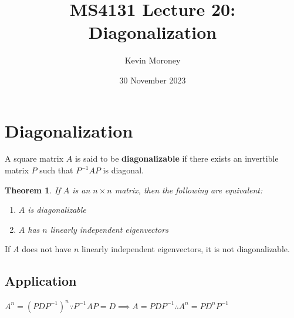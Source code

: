 \documentclass[a4paper, 12pt]{article}
\title{MS4131 Lecture 20: Diagonalization}
\author{Kevin Moroney}
\date{30 November 2023}
\newtheorem{theorem}{Theorem}[section]
\newenvironment{definition}[1][Definition]{\begin{trivlist}
\item[\hskip \labelsep {\bfseries #1}]}{\end{trivlist}}
\newenvironment{remark}[1][Remark]{\begin{trivlist}
\item[\hskip \labelsep {\bfseries #1}]}{\end{trivlist}}
\newcommand{\keyword}[1]{\textbf{#1}}
\begin{document}
    \maketitle
    \section{Diagonalization}
    \begin{definition}
        A square matrix $A$ is said to be \keyword{diagonalizable} if there exists an
        invertible matrix $P$ such that $P^{-1}AP$ is diagonal.
    \end{definition}
    \begin{theorem}
        If $A$ is an $n \times n$ matrix, then the following are equivalent:
        \begin{enumerate}
            \item $A$ is diagonalizable
            \item $A$ has $n$ linearly independent eigenvectors
        \end{enumerate}
    \end{theorem}
    \begin{remark}
        If $A$ does not have $n$ linearly independent eigenvectors, it is not
        diagonalizable.
    \end{remark}
    \subsection*{Application}
    $A^n = (PDP^{-1})^n \because P^{-1}AP = D \implies A = PDP^{-1} \therefore A^n = PD^nP^{-1}$
\end{document}
